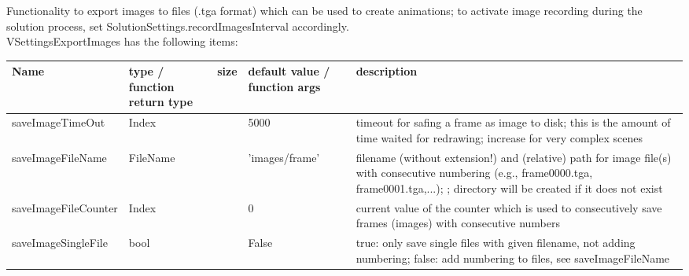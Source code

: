  \label{sec:VSettingsExportImages}
Functionality to export images to files (.tga format) which can be used to create animations; to activate image recording during the solution process, set SolutionSettings.recordImagesInterval accordingly.\\ 
%
VSettingsExportImages has the following items:
\begin{center}
  \footnotesize
  \begin{longtable}{| p{4.2cm} | p{2.5cm} | p{0.3cm} | p{3.0cm} | p{6cm} |}
    \hline
    \bf Name & \bf type / function return type & \bf size & \bf default value / function args & \bf description \\ \hline
    saveImageTimeOut &     Index &      &     5000 &     timeout for safing a frame as image to disk; this is the amount of time waited for redrawing; increase for very complex scenes\\ \hline
    saveImageFileName &     FileName &      &     'images/frame' &     filename (without extension!) and (relative) path for image file(s) with consecutive numbering (e.g., frame0000.tga, frame0001.tga,...); ; directory will be created if it does not exist\\ \hline
    saveImageFileCounter &     Index &      &     0 &     current value of the counter which is used to consecutively save frames (images) with consecutive numbers\\ \hline
    saveImageSingleFile &     bool &      &     False &     true: only save single files with given filename, not adding numbering; false: add numbering to files, see saveImageFileName\\ \hline
	  \end{longtable}
	\end{center}

